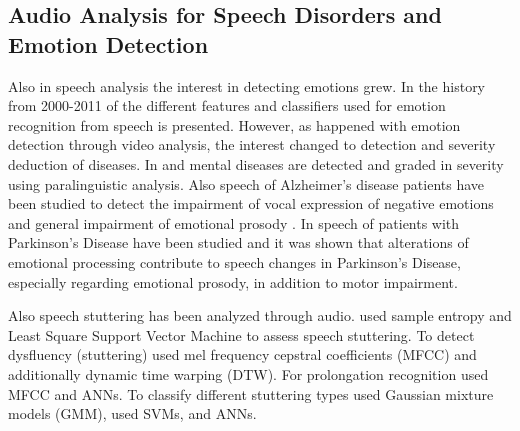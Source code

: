 \subsection{Audio Analysis for Speech Disorders and Emotion Detection}

Also in speech analysis the interest in detecting emotions grew. In \cite{Anagnostopoulos2015survey} the history from 2000-2011 of the different features and classifiers used for emotion recognition from speech is presented. However, as happened with emotion detection through video analysis, the interest changed to detection and severity deduction of diseases. In \cite{Cummins2016} and \cite{Singh2017} mental diseases are detected and graded in severity using paralinguistic analysis. Also speech of Alzheimer's disease patients have been studied \cite{Lopez-de-Ipina2015b,Lopez-de-Ipina2014} to detect the 
impairment of vocal expression of negative emotions\cite{Zaytseva2014,Lopez-de-Ipina2015} and general impairment of emotional prosody \cite{Horley2010}. In  \cite{Schuller2015interspeech,Moebes2008,Zhao2014} speech of patients with Parkinson's Disease have been studied and it was shown that alterations of emotional processing contribute to speech changes in Parkinson's Disease, especially regarding emotional prosody, in addition to motor impairment.

Also speech stuttering has been analyzed through audio. \cite{Hariharan2012} used sample entropy and Least Square Support Vector Machine to assess speech stuttering. To detect dysfluency (stuttering) \cite{jhawar2016speech} used mel frequency cepstral coefficients (MFCC) and \cite{Ramteke2016} additionally dynamic time warping (DTW). For prolongation recognition \cite{Chee2009} used MFCC and \cite{Savin2016} ANNs. To classify different stuttering types \cite{Mahesha2016} used Gaussian mixture models (GMM), \cite{Mahesha2015} used SVMs, and \cite{Pravin2017} ANNs.



\begin{comment}
-	What are the state-of-the-art techniques?\\
-	What are the challenges to detect speech disorders?\\

\subsection{Datasets}
new generation of databases: \cite{DouglasCowie2003}\\



\url{http://vkc.mc.vanderbilt.edu/childhoodstuttering/forscientists_datasets.html}\\

paper: The UCLASS archive of stuttered speech\\
\end{comment}



